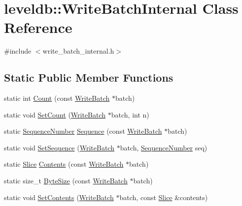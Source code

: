 \hypertarget{classleveldb_1_1_write_batch_internal}{\section{leveldb\-:\-:Write\-Batch\-Internal Class Reference}
\label{classleveldb_1_1_write_batch_internal}
}


{\ttfamily \#include $<$write\-\_\-batch\-\_\-internal.\-h$>$}

\subsection*{Static Public Member Functions}
\begin{DoxyCompactItemize}
\item 
static int \hyperlink{classleveldb_1_1_write_batch_internal_a5270ca4567dbae1524005ad14e0698e3}{Count} (const \hyperlink{classleveldb_1_1_write_batch}{Write\-Batch} $\ast$batch)
\item 
static void \hyperlink{classleveldb_1_1_write_batch_internal_ae03d20619da53aae175dd28d61c90bd9}{Set\-Count} (\hyperlink{classleveldb_1_1_write_batch}{Write\-Batch} $\ast$batch, int n)
\item 
static \hyperlink{namespaceleveldb_a5481ededd221c36d652c371249f869fa}{Sequence\-Number} \hyperlink{classleveldb_1_1_write_batch_internal_af657c82bd9378b78c35a3a7429f945d4}{Sequence} (const \hyperlink{classleveldb_1_1_write_batch}{Write\-Batch} $\ast$batch)
\item 
static void \hyperlink{classleveldb_1_1_write_batch_internal_a0ca3483de37433fb0ce37b1e91f01bd1}{Set\-Sequence} (\hyperlink{classleveldb_1_1_write_batch}{Write\-Batch} $\ast$batch, \hyperlink{namespaceleveldb_a5481ededd221c36d652c371249f869fa}{Sequence\-Number} seq)
\item 
static \hyperlink{classleveldb_1_1_slice}{Slice} \hyperlink{classleveldb_1_1_write_batch_internal_a348947b16653c8a17590b13115b5274d}{Contents} (const \hyperlink{classleveldb_1_1_write_batch}{Write\-Batch} $\ast$batch)
\item 
static size\-\_\-t \hyperlink{classleveldb_1_1_write_batch_internal_adad424f13cc3e3ed4a2eacb88eaa39df}{Byte\-Size} (const \hyperlink{classleveldb_1_1_write_batch}{Write\-Batch} $\ast$batch)
\item 
static void \hyperlink{classleveldb_1_1_write_batch_internal_aa07e75250aed00d06f2e4df85ee926b9}{Set\-Contents} (\hyperlink{classleveldb_1_1_write_batch}{Write\-Batch} $\ast$batch, const \hyperlink{classleveldb_1_1_slice}{Slice} \&contents)

\end{DoxyCompactItemize}
